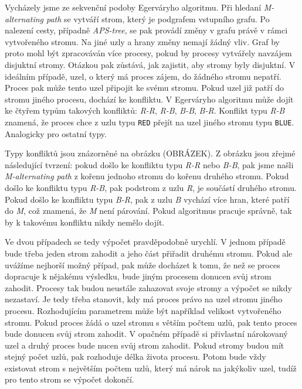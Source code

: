 \documentclass[a4paper, 12pt, titlepage, final]{article}[3. prosinec 2011]
\begin{document}
Vycházely jsme ze sekvenční podoby Egerváryho algoritmu. Při hledaní \textit{M-alternating path} se vytváří strom, který je podgrafem vstupního grafu. Po nalezení cesty, případně \textit{APS-tree}, se pak provádí změny v grafu právě v rámci vytvořeného stromu. Na jiné uzly a hrany změny nemají žádný vliv. Graf by proto mohl být zpracováván více procesy, pokud by procesy vytvářely navzájem disjuktní stromy. Otázkou pak zůstává, jak zajistit, aby stromy byly disjuktní. V ideálním případě, uzel, o který má proces zájem, do žádného stromu nepatří. Proces pak může tento uzel připojit ke svému stromu. Pokud uzel již patří do stromu jiného procesu, dochází ke konfliktu. V Egerváryho algoritmu může dojít ke čtyřem typům takových konfliktů: \textit{R-R}, \textit{R-B}, \textit{B-B}, \textit{B-R}. Konflikt typu \textit{R-B} znamená, že proces chce z uzlu typu \texttt{RED} přejít na uzel jiného stromu typu \texttt{BLUE}. Analogicky pro ostatní typy.

Typy konfliktů jsou znázorněné na obrázku (OBRÁZEK). Z obrázku jsou zřejmé následující tvrzení: pokud došlo ke konfliktu typu \textit{R-R} nebo \textit{B-B}, pak jsme našli \textit{M-alternating path} z kořenu jednoho stromu do kořenu druhého stromu. Pokud došlo ke konfliktu typu \textit{R-B}, pak podstrom z uzlu \textit{R}, je součástí druhého stromu. Pokud došlo ke konfliktu typu \textit{B-R}, pak z uzlu \textit{B} vychází více hran, které patří do \textit{M}, což znamená, že \textit{M} není párování. Pokud algoritmus pracuje správně, tak by k takovému konfliktu nikdy nemělo dojít. 

Ve dvou případech se tedy výpočet pravděpodobně urychlí. V jednom případě bude třeba jeden strom zahodit a jeho část přiřadit druhému stromu. Pokud ale uvážíme nejhorší možný případ, pak může docházet k tomu, že než se proces dopracuje k nějakému výsledku, bude jiným procesem donucen svůj strom zahodit. Procesy tak budou neustále zahazovat svoje stromy a výpočet se nikdy nezastaví. Je tedy třeba stanovit, kdy má proces právo na uzel stromu jiného procesu. Rozhodujícím parametrem může být například velikost vytvořeného stromu. Pokud proces žádá o uzel stromu s větším počtem uzlů, pak tento proces bude donucen svůj strom zahodit. V opačném případě si přivlastní nárokovaný uzel a druhý proces bude nucen svůj strom zahodit. Pokud stromy budou mít stejný počet uzlů, pak rozhoduje délka života procesu. Potom bude vždy existovat strom s největším počtem uzlů, který má nárok na jakýkoliv uzel, tudíž pro tento strom se výpočet dokončí.
\end{document}
